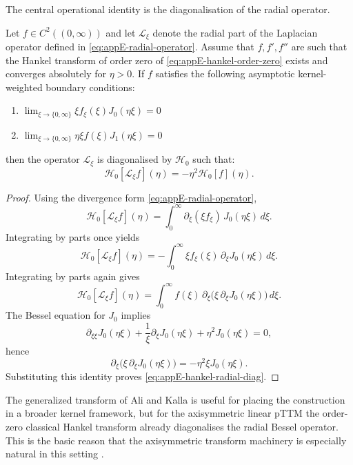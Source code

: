 The central operational identity is the diagonalisation of the radial operator.

\begin{proposition}
    \label{prop:appE-hankel-diagonalisation}
    Let $f \in C^2((0,\infty))$
    and let $\mathcal{L}_\xi$ denote the radial part of the Laplacian operator defined in \eqref{eq:appE-radial-operator}.
    Assume that $f, f', f''$ are such that the Hankel transform of order zero of \eqref{eq:appE-hankel-order-zero}
    exists and converges absolutely for $\eta > 0$. If $f$ satisfies the following asymptotic kernel-weighted boundary conditions:
    \begin{enumerate}
        \item $\lim_{\xi \to \{0, \infty\}} \xi f_\xi(\xi) J_0(\eta\xi) = 0$
        \item $\lim_{\xi \to \{0, \infty\}} \eta \xi f(\xi) J_1(\eta\xi) = 0$
    \end{enumerate}
    then the operator $\mathcal{L}_\xi$ is diagonalised by $\mathscr{H}_0$ such that:
    \begin{equation}
        \mathscr{H}_0[\mathcal{L}_\xi f](\eta) = -\eta^2 \mathscr{H}_0[f](\eta).
        \label{eq:appE-hankel-radial-diag}
    \end{equation}
\end{proposition}

\begin{proof}
    Using the divergence form \eqref{eq:appE-radial-operator},
    \[
        \mathscr{H}_0[\mathcal{L}_\xi f](\eta)
        =
        \int_0^\infty
        \partial_\xi(\xi f_\xi)\, J_0(\eta\xi)\, d\xi.
    \]
    Integrating by parts once yields
    \[
        \mathscr{H}_0[\mathcal{L}_\xi f](\eta)
        =
        -\int_0^\infty
        \xi f_\xi(\xi)\, \partial_\xi J_0(\eta\xi)\, d\xi.
    \]
    Integrating by parts again gives
    \[
        \mathscr{H}_0[\mathcal{L}_\xi f](\eta)
        =
        \int_0^\infty
        f(\xi)\,
        \partial_\xi\!\bigl(\xi\,\partial_\xi J_0(\eta\xi)\bigr)\, d\xi.
    \]
    The Bessel equation for \(J_0\) implies
    \[
        \partial_{\xi\xi}J_0(\eta\xi) + \frac{1}{\xi}\partial_\xi J_0(\eta\xi)
        + \eta^2 J_0(\eta\xi)=0,
    \]
    hence
    \[
        \partial_\xi\!\bigl(\xi\,\partial_\xi J_0(\eta\xi)\bigr)
        =
        -\eta^2 \xi J_0(\eta\xi).
    \]
    Substituting this identity proves \eqref{eq:appE-hankel-radial-diag}.
\end{proof}

\begin{remark}
    The generalized transform of Ali and Kalla \cite{Ali_Kalla_1999} is useful for
    placing the construction in a broader kernel framework, but for the
    axisymmetric linear pTTM the order-zero classical Hankel transform already
    diagonalises the radial Bessel operator. This is the basic reason that
    the axisymmetric transform machinery is especially natural in this setting
    \cite{Davies_2002_Hankel,Rogers_2012}.
\end{remark}

